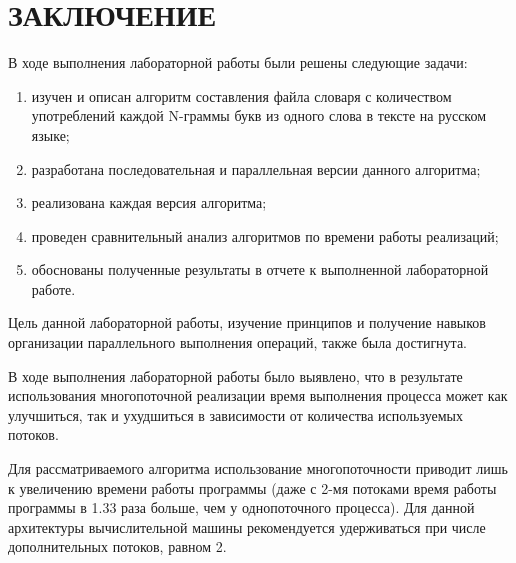 \chapter*{ЗАКЛЮЧЕНИЕ}

В ходе выполнения лабораторной работы были решены следующие задачи:

\begin{enumerate}[label={\arabic*)}]
	\item изучен и описан алгоритм составления файла словаря с количеством употреблений каждой N-граммы букв из одного слова в тексте на русском языке;
	\item разработана последовательная и параллельная версии данного алгоритма;
	\item реализована каждая версия алгоритма;
	\item проведен сравнительный анализ алгоритмов по времени работы реализаций;
	\item обоснованы полученные результаты в отчете к выполненной лабораторной работе.
\end{enumerate}

Цель данной лабораторной работы, изучение принципов и
получение навыков организации параллельного выполнения операций, также была достигнута.

В ходе выполнения лабораторной работы было выявлено, что в результате использования многопоточной реализации время выполнения процесса может как улучшиться, так и ухудшиться в зависимости от количества используемых потоков.

Для рассматриваемого алгоритма использование многопоточности приводит лишь к увеличению времени работы программы (даже с 2-мя потоками время работы программы в 1.33 раза больше, чем у однопоточного процесса). 
Для данной архитектуры вычислительной машины рекомендуется удерживаться при числе дополнительных потоков, равном 2.
